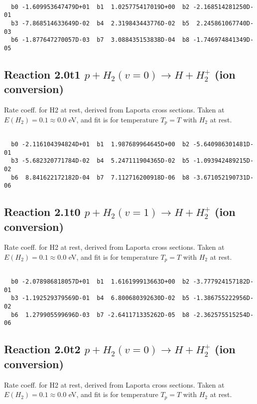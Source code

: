 \begin{small}\begin{verbatim}

  b0 -1.609953647479D+01  b1  1.025775417019D+00  b2 -2.168514281250D-01
  b3 -7.868514633649D-02  b4  2.319843443776D-02  b5  2.245861067740D-03
  b6 -1.877647270057D-03  b7  3.088435153838D-04  b8 -1.746974841349D-05

\end{verbatim}\end{small}

\newpage
\subsection{
Reaction 2.0t1
$ p + H_2(v=0) \rightarrow H + H_2^+$ (ion conversion)
}
Rate coeff. for H2 at rest, derived from Laporta cross sections.
Taken at $E(H_2) = 0.1 \approx 0.0$ eV,  and fit is for temperature $T_p=T$ with $H_2$ at rest.

\begin{small}\begin{verbatim}

  b0 -2.116104394824D+01  b1  1.987689964645D+00  b2 -5.640986301481D-01
  b3 -5.682320771784D-02  b4  5.247111904365D-02  b5 -1.093942489215D-02
  b6  8.841622172182D-04  b7  7.112716200918D-06  b8 -3.671052190731D-06

\end{verbatim}\end{small}

\newpage
\subsection{
Reaction 2.1t0
$ p + H_2(v=1) \rightarrow H + H_2^+$ (ion conversion)
}
Rate coeff. for H2 at rest, derived from Laporta cross sections.
Taken at $E(H_2) = 0.1 \approx 0.0$ eV,  and fit is for temperature $T_p=T$ with $H_2$ at rest.

\begin{small}\begin{verbatim}

  b0 -2.078986818057D+01  b1  1.616199913663D+00  b2 -3.777924157182D-01
  b3 -1.192529379569D-01  b4  6.800680392630D-02  b5 -1.386755222956D-02
  b6  1.279905599696D-03  b7 -2.641171335262D-05  b8 -2.362575515254D-06

\end{verbatim}\end{small}

\newpage
\subsection{
Reaction 2.0t2
$ p + H_2(v=0) \rightarrow H + H_2^+$ (ion conversion)
}
Rate coeff. for H2 at rest, derived from Laporta cross sections.
Taken at $E(H_2) = 0.1 \approx 0.0$ eV,  and fit is for temperature $T_p=T$ with $H_2$ at rest.

